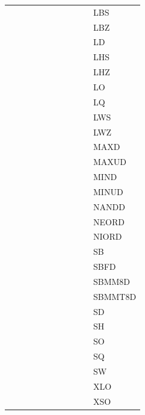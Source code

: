 {\begin{tabular}{|l|l|l|l|l|l|l|l|l|l|l|}
 & & & & & & & & & & \textsf{LBS} \\
 & & & & & & & & & & \textsf{LBZ} \\
 & & & & & & & & & & \textsf{LD} \\
 & & & & & & & & & & \textsf{LHS} \\
 & & & & & & & & & & \textsf{LHZ} \\
 & & & & & & & & & & \textsf{LO} \\
 & & & & & & & & & & \textsf{LQ} \\
 & & & & & & & & & & \textsf{LWS} \\
 & & & & & & & & & & \textsf{LWZ} \\
 & & & & & & & & & & \textsf{MAXD} \\
 & & & & & & & & & & \textsf{MAXUD} \\
 & & & & & & & & & & \textsf{MIND} \\
 & & & & & & & & & & \textsf{MINUD} \\
 & & & & & & & & & & \textsf{NANDD} \\
 & & & & & & & & & & \textsf{NEORD} \\
 & & & & & & & & & & \textsf{NIORD} \\
 & & & & & & & & & & \textsf{SB} \\
 & & & & & & & & & & \textsf{SBFD} \\
 & & & & & & & & & & \textsf{SBMM8D} \\
 & & & & & & & & & & \textsf{SBMMT8D} \\
 & & & & & & & & & & \textsf{SD} \\
 & & & & & & & & & & \textsf{SH} \\
 & & & & & & & & & & \textsf{SO} \\
 & & & & & & & & & & \textsf{SQ} \\
 & & & & & & & & & & \textsf{SW} \\
 & & & & & & & & & & \textsf{XLO} \\
 & & & & & & & & & & \textsf{XSO} \\
\hline
\hline\end{tabular}
}
\smallskip

